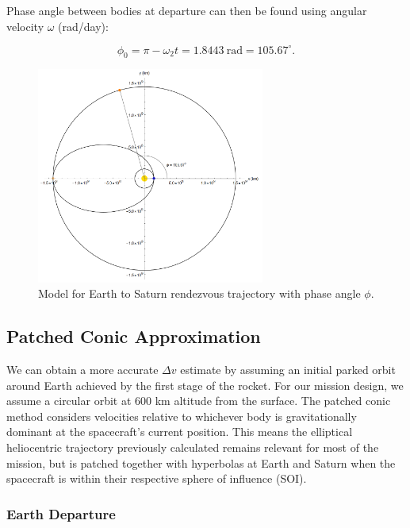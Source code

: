 \documentclass[conf]{new-aiaa}
\begin{document}
Phase angle between bodies at departure can then be found using angular velocity $\omega$ (rad/day): 

\begin{equation}
\phi_0 = \pi -\omega_2 t = 1.8443 \ \text {rad} = 105.67^{\circ}.
\end{equation}

\begin{figure}[htp]
    \centering
    \includegraphics[width=7.5cm]{Project Figure 1.png}
    \caption{Model for Earth to Saturn rendezvous trajectory with phase angle $\phi$.}
\end{figure}

\subsection{Patched Conic Approximation}

We can obtain a more accurate $\Delta v$ estimate by assuming an initial parked orbit around Earth achieved by the first stage of the rocket. For our mission design, we assume a circular orbit at 600 km altitude from the surface. The patched conic method considers velocities relative to whichever body is gravitationally dominant at the spacecraft's current position. This means the elliptical heliocentric trajectory previously calculated remains relevant for most of the mission, but is patched together with hyperbolas at Earth and Saturn when the spacecraft is within their respective sphere of influence (SOI).

\subsubsection{Earth Departure}
\end{document}
